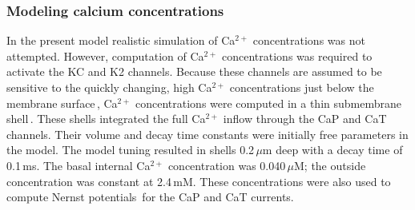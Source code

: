 \documentclass[12pt]{article}
\begin{document}
\subsubsection*{Modeling calcium concentrations}

In the present model realistic simulation of Ca$^{2+}$ concentrations was not attempted. However, computation of Ca$^{2+}$ concentrations was required to activate the
KC and K2 channels. Because these channels are assumed to be
sensitive to the quickly changing, high Ca$^{2+}$ concentrations just
below the membrane surface\,\cite{L:1989ff}, Ca$^{2+}$ concentrations were 
computed in a thin submembrane shell\,\cite{D:1982lh}. These shells integrated the full Ca$^{2+}$ inflow through
the CaP and CaT channels. Their volume and decay time constants
were initially free parameters in the model. The model tuning
resulted in shells 0.2\,$\mu$m deep with a decay time of 0.1\,ms.
The basal internal Ca$^{2+}$ concentration was 0.040\,$\mu$M; the outside
concentration was constant at 2.4\,mM. These concentrations
were also used to compute Nernst potentials\,\cite{Hille:1991zr} for the
CaP and CaT currents.



\end{document}
